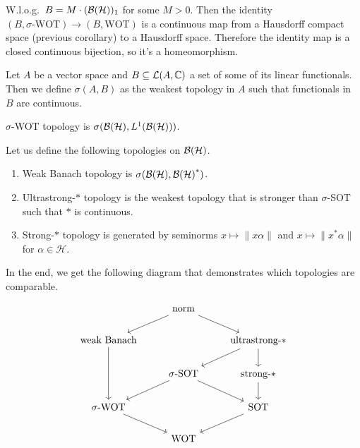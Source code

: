 \begin{myproof}
  W.l.o.g.~$B = M \cdot (\operatorname{\mathcal{B} (\mathcal{H})})_1$ for some $M > 0$. Then the identity $(B, \textrm{$\sigma$-WOT}) \to (B, \textrm{WOT})$
  is a continuous map from a Hausdorff compact space (previous corollary) to a Hausdorff space.
  Therefore the identity map is a closed continuous bijection, so it's a homeomorphism.
\end{myproof}

\begin{definition}
  Let $A$ be a vector space and $B \subseteq \mathcal{L} (A, \mathbb {C})$ a set of some of its linear functionals.
  Then we define $\sigma(A, B)$ as the weakest topology in $A$ such that functionals in $B$ are continuous. 
\end{definition}

\begin{remark}
  $\sigma$-WOT topology is $\sigma(\operatorname{\mathcal{B} (\mathcal{H})}, L^1 (\operatorname{\mathcal{B} (\mathcal{H})}))$.
\end{remark}

\begin{remark}
  Let us define the following topologies on $\operatorname{\mathcal{B} (\mathcal{H})}$.
  \begin{enumerate}
    \item Weak Banach topology is $\sigma(\operatorname{\mathcal{B} (\mathcal{H})}, \operatorname{\mathcal{B} (\mathcal{H})}^*)$.
    \item Ultrastrong-$*$ topology is the weakest topology that is stronger than $\sigma$-SOT such that $*$ is continuous.
    \item Strong-$*$ topology is generated by seminorms $x \mapsto \|x\alpha\|$ and $x \mapsto \|x^* \alpha\|$ for $\alpha \in \mathcal{H}$.
  \end{enumerate}
\end{remark}

In the end, we get the following diagram that demonstrates which topologies are comparable.

\[\begin{tikzcd}
	& {\textrm{norm}} \\
	{\textrm{weak Banach}} && {\textrm{ultrastrong-$*$}} \\
	& {\textrm{$\sigma$-SOT}} & {\textrm{strong-$*$}} \\
	{\textrm{$\sigma$-WOT}} && {\textrm{SOT}} \\
	& {\textrm{WOT}}
	\arrow[from=1-2, to=2-3]
	\arrow[from=1-2, to=2-1]
	\arrow[from=2-3, to=3-2]
	\arrow[from=2-3, to=3-3]
	\arrow[from=2-1, to=4-1]
	\arrow[from=3-2, to=4-1]
	\arrow[from=3-2, to=4-3]
	\arrow[from=3-3, to=4-3]
	\arrow[from=4-1, to=5-2]
	\arrow[from=4-3, to=5-2]
\end{tikzcd}\]